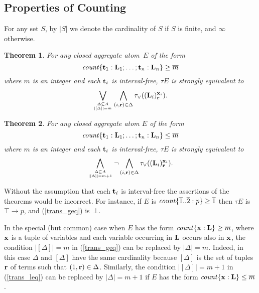 \documentclass{tlp}
\def\rar{\rightarrow}
\def\beq{\begin{equation}}
\def\eeq#1{\label{#1}\end{equation}}
\newtheorem{theorem}{Theorem}
\begin{document}
\subsection{Properties of Counting} \label{sec:count}

For any set $S$, by $\lvert S \rvert$ we denote the cardinality of 
$S$ if $S$ is finite, and $\infty$ otherwise. 

\begin{theorem}\label{lem:geq}
For any closed aggregate atom~$E$ of the form
$$
{\it count}\{{\bf t}_1 : {\bf L}_1; \dots ; {\bf t}_n : {\bf L}_n \} \geq \overline m
$$
where $m$ is an integer and each ${\bf t}_i$ is interval-free, $\tau E$ is 
strongly equivalent to 
\beq
  \bigvee_{\Delta\subseteq A \atop \lvert [\Delta] \rvert = m}  
  \bigwedge_{(i,{\bf r}) \in \Delta}
  \tau_{\lor}(({\bf L}_i)^{{\bf x}_i}_{\bf r}).
\eeq{trans_geq} 
\end{theorem}

\begin{theorem}\label{lem:leq}
For any closed aggregate atom $E$ of the form
$$
{\it count}\{{\bf t}_1 : {\bf L}_1; \dots ; {\bf t}_n : {\bf L}_n \} \leq \overline m
$$
where $m$ is an integer and each ${\bf t}_i$ is interval-free, $\tau E$ is 
strongly equivalent to 
\beq
  \bigwedge_{\Delta \subseteq A \atop \lvert [\Delta] \rvert = m+1}  \neg 
  \bigwedge_{(i, {\bf r}) \in\Delta} \tau_{\lor}
  (({\bf L}_i)^{{\bf x}_i}_{\bf r}).
\eeq{trans_leq}
\end{theorem}

Without the assumption that each ${\bf t}_i$ is interval-free the assertions 
of the theorems would be incorrect. For instance, if $E$ is
${\it count}\{\overline 1..\overline 2:p\} \geq \overline 1$ then $\tau E$ is $\top \rar p$, and
(\ref{trans_geq}) is~$\bot$. 

In the special (but common) case when $E$ has the form 
${\it count}\{{\bf x}: {\bf L}\} \geq \overline m$,
where ${\bf x}$ is a tuple of variables and each variable occurring in 
${\bf L}$ occurs also in ${\bf x}$,
the condition $\lvert [\Delta] \rvert = m$ in (\ref{trans_geq})
can be replaced by $\lvert \Delta \rvert = m$. Indeed, in this case
$\Delta$ and $[\Delta]$ have the same cardinality because $[\Delta]$ 
is the set of tuples ${\bf r}$ of terms such that $(1, {\bf r}) \in \Delta$. 
Similarly,  the condition $\lvert [\Delta] \rvert = m+1$ in (\ref{trans_leq})
can be replaced by $\lvert \Delta \rvert = m+1$ if 
$E$ has the form ${\it count}\{{\bf x}: {\bf L}\} \leq \overline m$.
\end{document}
